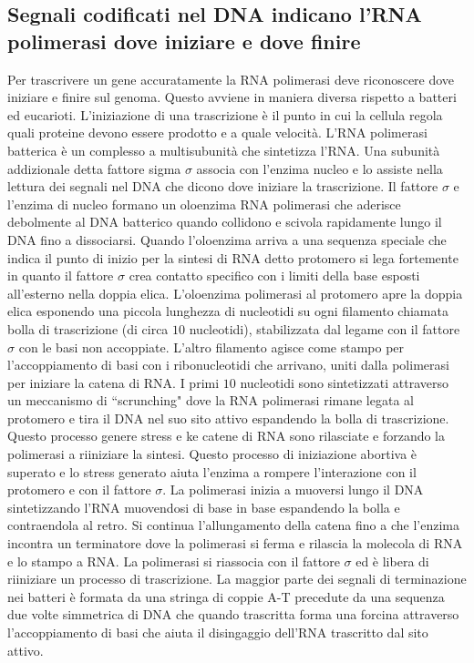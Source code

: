 \subsection{Segnali codificati nel DNA indicano l'RNA polimerasi dove iniziare e dove finire}
Per trascrivere un gene accuratamente la RNA polimerasi deve riconoscere dove iniziare e finire sul genoma. Questo avviene in maniera diversa rispetto a batteri ed eucarioti. 
L'iniziazione di una trascrizione \`e il punto in cui la cellula regola quali proteine devono essere prodotto e a quale velocit\`a. L'RNA polimerasi batterica \`e un complesso a 
multisubunit\`a che sintetizza l'RNA. Una subunit\`a addizionale detta fattore sigma $\sigma$ associa con l'enzima nucleo e lo assiste nella lettura dei segnali nel DNA che dicono dove
iniziare la trascrizione. Il fattore $\sigma$ e l'enzima di nucleo formano un oloenzima RNA polimerasi che aderisce debolmente al DNA batterico quando collidono e scivola rapidamente 
lungo il DNA fino a dissociarsi. Quando l'oloenzima arriva a una sequenza speciale che indica il punto di inizio per la sintesi di RNA detto protomero si lega fortemente in quanto il 
fattore $\sigma$  crea contatto specifico con i limiti della base esposti all'esterno nella doppia elica. L'oloenzima polimerasi al protomero apre la doppia elica esponendo una piccola
lunghezza di nucleotidi su ogni filamento chiamata bolla di trascrizione (di circa $10$ nucleotidi), stabilizzata dal legame con il fattore $\sigma$ con le basi non accoppiate. L'altro
filamento agisce come stampo per l'accoppiamento di basi con i ribonucleotidi che arrivano, uniti dalla polimerasi per iniziare la catena di RNA. I primi $10$ nucleotidi sono 
sintetizzati attraverso un meccanismo di ``scrunching" dove la RNA polimerasi rimane legata al protomero e tira il DNA nel suo sito attivo espandendo la bolla di trascrizione. Questo
processo genere stress e ke catene di RNA sono rilasciate e forzando la polimerasi a riiniziare la sintesi. Questo processo di iniziazione abortiva \`e superato e lo stress generato 
aiuta l'enzima a rompere l'interazione con il protomero e con il fattore $\sigma$. La polimerasi inizia a muoversi lungo il DNA sintetizzando l'RNA muovendosi di base in base espandendo
la bolla e contraendola al retro. Si continua l'allungamento della catena fino a che l'enzima incontra un terminatore dove la polimerasi si ferma e rilascia la molecola di RNA e lo 
stampo a RNA. La polimerasi si riassocia con il fattore $\sigma$ ed \`e libera di riiniziare un processo di trascrizione. La maggior parte dei segnali di terminazione nei batteri \`e
formata da una stringa di coppie A-T precedute da una sequenza due volte simmetrica  di DNA che quando trascritta forma una forcina attraverso l'accoppiamento di basi che aiuta il 
disingaggio dell'RNA trascritto dal sito attivo.
